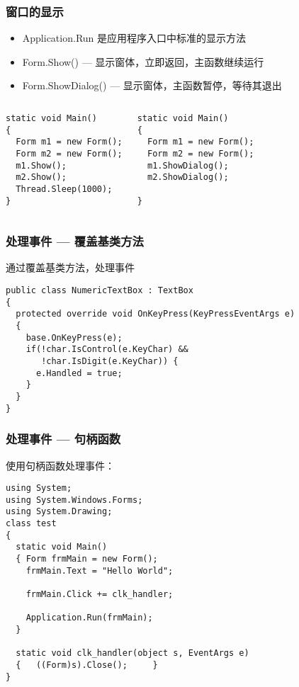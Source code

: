 \begin{frame}[fragile]
\frametitle{窗口的显示}
\begin{itemize}
\item Application.Run 是应用程序入口中标准的显示方法
\item Form.Show() --- 显示窗体，立即返回，主函数继续运行
\item Form.ShowDialog() --- 显示窗体，主函数暂停，等待其退出
\end{itemize}
\begin{columns}
\begin{lstlisting}
static void Main()
{
  Form m1 = new Form();
  Form m2 = new Form();
  m1.Show();
  m2.Show();
  Thread.Sleep(1000);
}
\end{lstlisting}
\begin{lstlisting}
static void Main()
{
  Form m1 = new Form();
  Form m2 = new Form();
  m1.ShowDialog();
  m2.ShowDialog();

}

\end{lstlisting}
\end{columns}
\end{frame}

\begin{frame}[fragile]
\frametitle{处理事件 --- 覆盖基类方法}
通过覆盖基类方法，处理事件
\begin{lstlisting}
public class NumericTextBox : TextBox
{
  protected override void OnKeyPress(KeyPressEventArgs e)
  {
    base.OnKeyPress(e);
    if(!char.IsControl(e.KeyChar) && 
       !char.IsDigit(e.KeyChar)) {
      e.Handled = true;
    }
  }
}
\end{lstlisting}
\end{frame}

\begin{frame}[fragile]
\frametitle{处理事件 --- 句柄函数}
使用句柄函数处理事件：
\begin{lstlisting}
using System;
using System.Windows.Forms;
using System.Drawing;
class test
{ 
  static void Main()
  { Form frmMain = new Form();
    frmMain.Text = "Hello World";

    frmMain.Click += clk_handler;

    Application.Run(frmMain);
  }

  static void clk_handler(object s, EventArgs e)
  {   ((Form)s).Close();     }
}
\end{lstlisting}
\end{frame}


